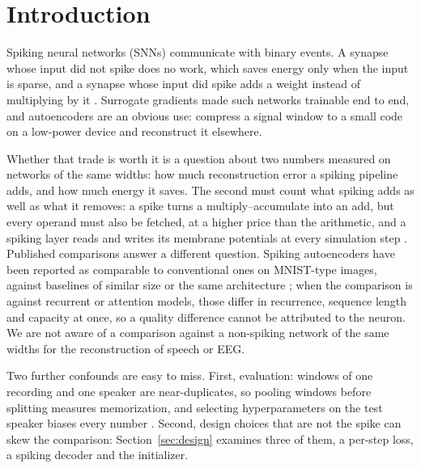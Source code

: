 \documentclass[conference]{IEEEtran}
\begin{document}
\section{Introduction}

\par Spiking neural networks (SNNs) communicate with binary events. A synapse whose input did
not spike does no work, which saves energy only when the input is sparse, and a synapse whose
input did spike adds a weight instead of multiplying by it \cite{lemaire2022analytical}. Surrogate gradients
\cite{neftci2019surrogate,zenke2018superspike,zenke2021remarkable} made such networks
trainable end to end, and autoencoders are an obvious use: compress a signal window to a
small code on a low-power device and reconstruct it elsewhere.

\par Whether that trade is worth it is a question about two numbers measured on networks of
the same widths: how much reconstruction error a spiking pipeline adds, and how much energy it
saves. The second must count what spiking adds as well as what it removes: a spike turns a
multiply--accumulate into an add, but every operand must also be fetched, at a higher price
than the arithmetic, and a spiking layer reads and writes its membrane potentials at every
simulation step \cite{lemaire2022analytical}. Published comparisons
answer a different question. Spiking autoencoders have been
reported as comparable to conventional ones on MNIST-type images, against baselines of
similar size \cite{comsa2021spiking} or the same architecture \cite{kamata2022fully}; when
the comparison is against recurrent or attention models, those differ in recurrence, sequence
length and capacity at once, so a quality difference cannot be attributed to the neuron. We
are not aware of a comparison against a non-spiking network of the same widths for the
reconstruction of speech or EEG.

\par Two further confounds are easy to miss. First, evaluation: windows of one recording and
one speaker are near-duplicates, so pooling windows before splitting measures memorization,
and selecting hyperparameters on the test speaker biases every number \cite{cawley2010overfitting}.
Second, design choices that are not the spike can skew the comparison:
Section~\ref{sec:design} examines three of them, a per-step loss, a spiking decoder and the
initializer.
\end{document}
